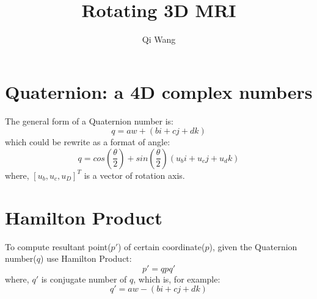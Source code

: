 \documentclass{article}
\begin{document}
\title{Rotating 3D MRI}
\author{Qi Wang}
\section{Quaternion: a 4D complex numbers}
The general form of a Quaternion number is:
$$q = aw + (bi + cj + dk)$$
which could be rewrite as a format of angle:
$$q = cos(\frac{\theta}{2}) + sin(\frac{\theta}{2})(u_bi + u_cj + u_dk)$$ 
where, $[u_b, u_c, u_D]^T$ is a vector of rotation axis.
\section{Hamilton Product}
To compute resultant point($p'$) of certain coordinate($p$), given the Quaternion number($q$) use Hamilton Product:
$$p' = qpq'$$
where, $q'$ is conjugate number of $q$, which is, for example:
$$q' = aw - (bi + cj + dk)$$
\end{document}
